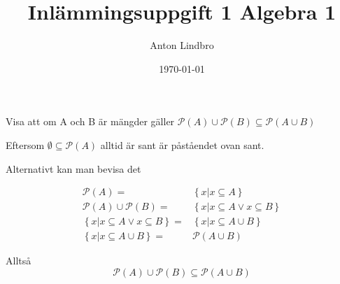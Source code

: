 \documentclass[a4paper]{article}
\title{Inlämmingsuppgift 1 Algebra 1}
\author{Anton Lindbro}
\date{\today}
\begin{document}
\maketitle

Visa att om A och B är mängder gäller $\mathcal{P}(A) \cup \mathcal{P}(B) \subseteq \mathcal{P}(A \cup B)$

Eftersom $ \emptyset \subseteq \mathcal{P}(A)$ alltid är sant är påståendet ovan sant.

Alternativt kan man bevisa det

\begin{align}
    \mathcal{P}(A) =& \left\{x | x \subseteq A\right\}\\
    \mathcal{P}(A) \cup \mathcal{P}(B) =& \left\{x | x \subseteq A \lor x \subseteq B\right\}\\
    \left\{x | x \subseteq A \lor x \subseteq B \right\} =& \left\{x | x \subseteq A \cup B\right\} \\
    \left\{x | x \subseteq A \cup B\right\} =& \mathcal{P}(A \cup B)
\end{align}

Alltså
\begin{equation}
    \mathcal{P}(A) \cup \mathcal{P}(B) \subseteq \mathcal{P}(A \cup B)
\end{equation}
\end{document}
